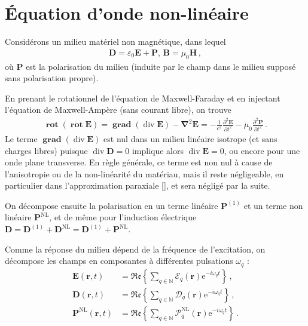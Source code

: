 \documentclass[11pt,a4paper]{article}
\newcommand{\ncite}[1]{[\citenum{#1}]}
\DeclareMathOperator{\divg}{div}
\DeclareMathOperator{\rot}{\mathbf{rot}}
\DeclareMathOperator{\grad}{\mathbf{grad}}
\newcommand{\e}[1]{\text{e}^{#1}}
\newcommand{\mathsc}[1]{\mathrm{\scriptscriptstyle {#1}}}
\renewcommand{\v}[1]{\boldsymbol{\mathbf{#1}}}
\begin{document}


\newpage

\appendix
\section{\'Equation d'onde non-linéaire}  
\label{NL}
Considérons un milieu matériel non magnétique, dans lequel
\begin{align}
	\v D = \varepsilon_0 \v E + \v P \text{, } \v B = \mu_0 \v H\,,
\end{align}
où $\v P$ est la polarisation du milieu (induite par le champ dans le milieu supposé sans polarisation propre).

En prenant le rotationnel de l'équation de Maxwell-Faraday et en injectant l'équation de Maxwell-Ampère (sans courant libre), on trouve
\begin{align}
	\rot (\rot \v E) = \grad (\divg \v E) - \v \nabla^2 \v E = - \frac{1}{c^2} \frac{\partial^2 \v E}{\partial t^2} - \mu_0 \frac{\partial^2 \v P}{\partial t^2} \,.
\end{align}
Le terme $\grad (\divg \v E)$ est nul dans un milieu linéaire isotrope (et sans charges libres) puisque $\divg \v D=0$ implique alors $\divg \v E = 0$, ou encore pour une onde plane transverse. En règle générale, ce terme est non nul à cause de l'anisotropie ou de la non-linéarité du matériau, mais il reste négligeable, en particulier dans l'approximation paraxiale \ncite{boyd}, et sera négligé par la suite.



On décompose ensuite la polarisation en un terme linéaire $\v P^\mathsc{(1)}$ et un terme non linéaire $\v P^\mathsc{NL}$, et de même pour l'induction électrique $\v D = \v D^\mathsc{(1)} + \v D^\mathsc{NL} = \v D^\mathsc{(1)} + \v P^\mathsc{NL}$. 

Comme la réponse du milieu dépend de la fréquence de l'excitation, on décompose les champs en composantes à différentes pulsations $\omega_q$ :
\begin{align}
	\v E(\v r, t) &= \mathfrak{Re} \left\{ \sum_{q \in \mathbb N} \v {\boldsymbol{\mathcal E}}_q (\v r) \e{-i \omega_q t} \right\} \,, \\
	\v D(\v r, t) &= \mathfrak{Re} \left\{ \sum_{q \in \mathbb N} \v {\boldsymbol{\mathcal D}}_q (\v r) \e{-i \omega_q t} \right\} \,,\\
	\v P^\mathsc{NL}(\v r, t) &= \mathfrak{Re} \left\{ \sum_{q \in \mathbb N} \v {\boldsymbol{\mathcal P}}^\mathsc{NL}_q (\v r) \e{-i \omega_q t} \right\} \,.
\end{align}
\end{document}
